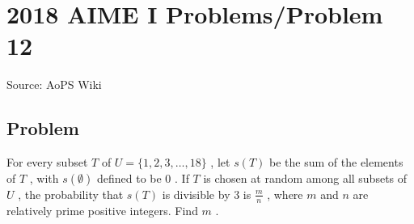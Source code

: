 \documentclass[12pt]{article}
\begin{document}
\section*{{2018 AIME I Problems/Problem 12}}
Source: AoPS Wiki

\subsection*{Problem}
For every subset $T$ of $U = \{ 1,2,3,\ldots,18 \}$ , let $s(T)$ be the sum of the elements of $T$ , with $s(\emptyset)$ defined to be $0$ . If $T$ is chosen at random among all subsets of $U$ , the probability that $s(T)$ is divisible by $3$ is $\frac{m}{n}$ , where $m$ and $n$ are relatively prime positive integers. Find $m$ .
\end{document}
